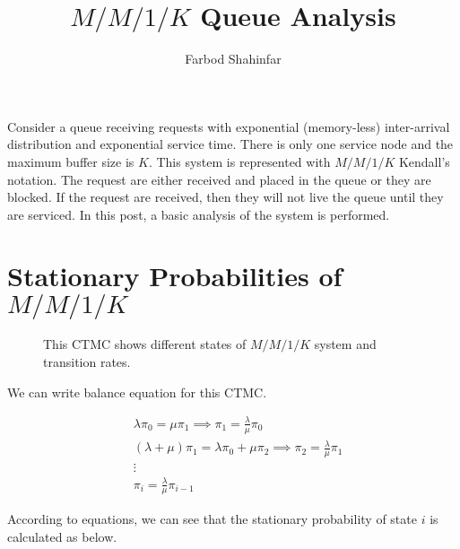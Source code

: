 \documentclass{article}
\title{$M/M/1/K$ Queue Analysis}
\author{Farbod Shahinfar}
\begin{document}
\maketitle{}

Consider a queue receiving requests with exponential (memory-less)
inter-arrival distribution and exponential service time. There is only one
service node and the maximum buffer size is $K$. This system is represented
with $M/M/1/K$ Kendall's notation. The request are either received and placed
in the queue or they are blocked. If the request are received, then they will
not live the queue until they are serviced. In this post, a basic analysis of
the system is performed.


\section{Stationary Probabilities of $M/M/1/K$}

\begin{figure}[!ht]
\centering
{}
	\caption{This CTMC shows different states of $M/M/1/K$ system and transition rates.}
\end{figure}


We can write balance equation for this CTMC.\@

\begin{align*}
	&\lambda \pi_0 = \mu \pi_1 \implies \pi_1 = \frac{\lambda}{\mu}\pi_0 \\
	& (\lambda + \mu) \pi_1 = \lambda \pi_0 + \mu \pi_2 \implies \pi_2 = \frac{\lambda}{\mu} \pi_1 \\
	& \vdots \\
	& \pi_i = \frac{\lambda}{\mu} \pi_{i-1}
\end{align*}

According to equations, we can see that the stationary probability of state $i$
is calculated as below.
\end{document}
